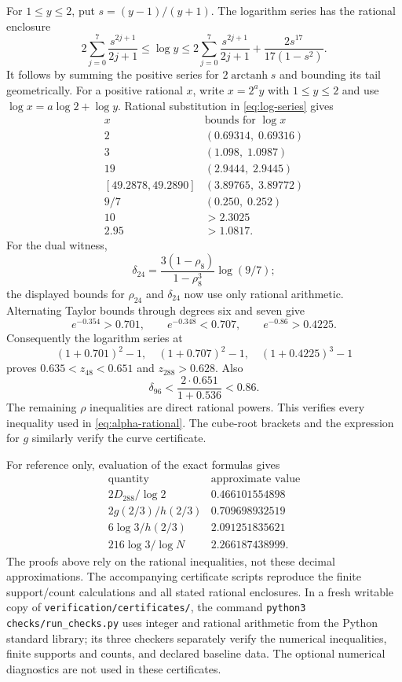 For \(1\le y\le2\), put \(s=(y-1)/(y+1)\).
The logarithm series has the rational enclosure
\begin{equation}\label{eq:log-series}
 2\sum_{j=0}^7\frac{s^{2j+1}}{2j+1}
 \le\log y\le
 2\sum_{j=0}^7\frac{s^{2j+1}}{2j+1}
       +\frac{2s^{17}}{17(1-s^2)}.
\end{equation}
It follows by summing the positive series for
\(2\operatorname{arctanh}s\) and bounding its tail geometrically.
For a positive rational \(x\), write \(x=2^a y\) with \(1\le y\le2\)
and use \(\log x=a\log2+\log y\).
Rational substitution in \eqref{eq:log-series} gives
\[
\begin{array}{c|c}
x&\text{bounds for }\log x\\ \hline
2&(0.69314,\;0.69316)\\
3&(1.098,\;1.0987)\\
19&(2.9444,\;2.9445)\\
{[49.2878,49.2890]}&(3.89765,\;3.89772)\\
9/7&(0.250,\;0.252)\\
10&>2.3025\\
2.95&>1.0817.
\end{array}
\]
For the dual witness,
\[
 \delta_{24}=
 \frac{3(1-\rho_8)}{1-\rho_8^3}\log(9/7);
\]
the displayed bounds for \(\rho_{24}\) and \(\delta_{24}\) now use
only rational arithmetic.
Alternating Taylor bounds through degrees six and seven give
\[
 e^{-0.354}>0.701,\qquad
 e^{-0.348}<0.707,\qquad
 e^{-0.86}>0.4225.
\]
Consequently the logarithm series at
\[
 (1+0.701)^2-1,\quad
 (1+0.707)^2-1,\quad
 (1+0.4225)^3-1
\]
proves \(0.635<z_{48}<0.651\) and \(z_{288}>0.628\).
Also
\[
 \delta_{96}<\frac{2\cdot0.651}{1+0.536}<0.86.
\]
The remaining \(\rho\) inequalities are direct rational powers.
This verifies every inequality used in \eqref{eq:alpha-rational}.
The cube-root brackets and the expression for \(g\) similarly verify
the curve certificate.

For reference only, evaluation of the exact formulas gives
\[
\begin{array}{c|c}
\text{quantity}&\text{approximate value}\\ \hline
2D_{288}/\log2&0.466101554898\\
2g(2/3)/h(2/3)&0.709698932519\\
6\log3/h(2/3)&2.091251835621\\
216\log3/\log N&2.266187438999.
\end{array}
\]
The proofs above rely on the rational inequalities, not these decimal
approximations.
The accompanying certificate scripts reproduce the finite
support/count calculations and all stated rational enclosures.
In a fresh writable copy of \texttt{verification/certificates/}, the command
\texttt{python3 checks/run\_checks.py}
uses integer and rational arithmetic from the Python standard library;
its three checkers separately verify the numerical inequalities,
finite supports and counts, and declared baseline data.
The optional numerical diagnostics are not used in these certificates.
